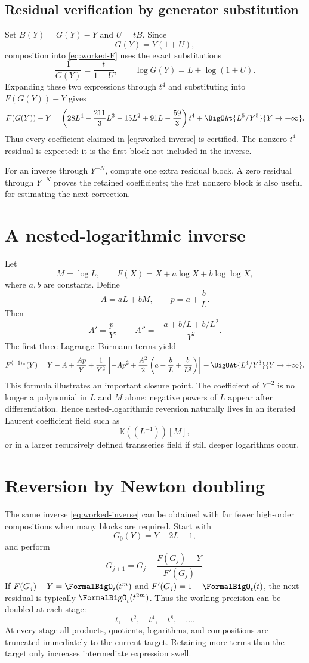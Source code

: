 \documentclass[11pt,oneside]{book}
\theoremstyle{definition}
\theoremstyle{remark}
\newcommand{\K}{\mathbb K}
\newcommand{\compinv}{^{\langle-1\rangle_{\circ}}}
\begin{document}
\subsection{Residual verification by generator substitution}
Set $B(Y)=G(Y)-Y$ and $U=tB$. Since
\[
 G(Y)=Y(1+U),
\]
composition into \eqref{eq:worked-F} uses the exact substitutions
\[
 \frac1{G(Y)}=\frac{t}{1+U},
 \qquad
 \log G(Y)=L+\log(1+U).
\]
Expanding these two expressions through $t^4$ and substituting into
$F(G(Y))-Y$ gives
\[
 F(G(Y))-Y
 =\left(28L^4-\frac{211}{3}L^3-15L^2+91L-\frac{59}{3}\right)t^4
 +\BigOAt{L^5/Y^5}{Y\to+\infty}.
\]
Thus every coefficient claimed in \eqref{eq:worked-inverse} is certified.
The nonzero $t^4$ residual is expected: it is the first block not included in
the inverse.

\begin{computebox}
For an inverse through $Y^{-N}$, compute one extra residual block. A zero
residual through $Y^{-N}$ proves the retained coefficients; the first
nonzero block is also useful for estimating the next correction.
\end{computebox}

\section{A nested-logarithmic inverse}
Let
\[
 M=\log L,\qquad
 F(X)=X+a\log X+b\log\log X,
\]
where $a,b$ are constants. Define
\[
 A=aL+bM,\qquad p=a+\frac bL.
\]
Then
\[
 A'=\frac{p}{Y},\qquad
 A''=-\frac{a+b/L+b/L^2}{Y^2}.
\]
The first three Lagrange--B\"urmann terms yield
\begin{align}
 F\compinv(Y)
 =Y-A+\frac{Ap}{Y}
 +\frac{1}{Y^2}\left[
   -Ap^2+\frac{A^2}{2}
   \left(a+\frac bL+\frac b{L^2}\right)\right]
 +\BigOAt{L^4/Y^3}{Y\to+\infty}.
 \label{eq:nested-log-inverse}
\end{align}
This formula illustrates an important closure point. The coefficient of
$Y^{-2}$ is no longer a polynomial in $L$ and $M$ alone: negative powers of
$L$ appear after differentiation. Hence nested-logarithmic reversion
naturally lives in an iterated Laurent coefficient field such as
\[
 \K((L^{-1}))[M],
\]
or in a larger recursively defined transseries field if still deeper
logarithms occur.

\section{Reversion by Newton doubling}
The same inverse \eqref{eq:worked-inverse} can be obtained with far fewer
high-order compositions when many blocks are required. Start with
\[
 G_0(Y)=Y-2L-1,
\]
and perform
\begin{equation}\label{eq:worked-newton}
 G_{j+1}
 =G_j-\frac{F(G_j)-Y}{F'(G_j)}.
\end{equation}
If $F(G_j)-Y=\FormalBigO_t(t^m)$ and
$F'(G_j)=1+\FormalBigO_t(t)$, the next residual is typically
$\FormalBigO_t(t^{2m})$. Thus the working precision can be doubled at
each stage:
\[
 t,\quad t^2,\quad t^4,\quad t^8,\quad\ldots.
\]
At every stage all products, quotients, logarithms, and compositions are
truncated immediately to the current target. Retaining more terms than the
target only increases intermediate expression swell.
\end{document}
